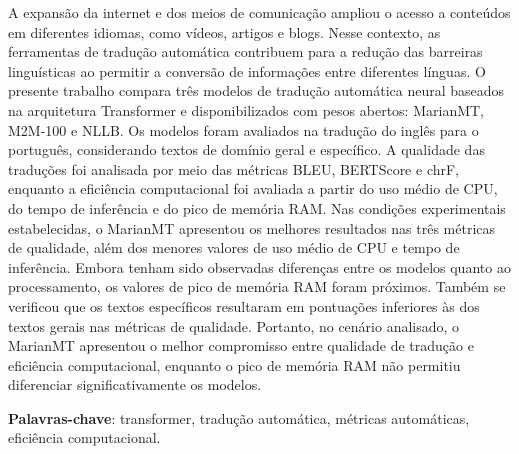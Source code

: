 \begin{resumo}

    \noindent
        A expansão da internet e dos meios de comunicação ampliou o acesso a conteúdos em diferentes idiomas, como vídeos, artigos e blogs. Nesse contexto, as ferramentas de tradução automática contribuem para a redução das barreiras linguísticas ao permitir a conversão de informações entre diferentes línguas. O presente trabalho compara três modelos de tradução automática neural baseados na arquitetura Transformer e disponibilizados com pesos abertos: MarianMT, M2M-100 e NLLB. Os modelos foram avaliados na tradução do inglês para o português, considerando textos de domínio geral e específico. A qualidade das traduções foi analisada por meio das métricas BLEU, BERTScore e chrF, enquanto a eficiência computacional foi avaliada a partir do uso médio de CPU, do tempo de inferência e do pico de memória RAM. Nas condições experimentais estabelecidas, o MarianMT apresentou os melhores resultados nas três métricas de qualidade, além dos menores valores de uso médio de CPU e tempo de inferência. Embora tenham sido observadas diferenças entre os modelos quanto ao processamento, os valores de pico de memória RAM foram próximos. Também se verificou que os textos específicos resultaram em pontuações inferiores às dos textos gerais nas métricas de qualidade. Portanto, no cenário analisado, o MarianMT apresentou o melhor compromisso entre qualidade de tradução e eficiência computacional, enquanto o pico de memória RAM não permitiu diferenciar significativamente os modelos.
    \noindent

    \textbf{Palavras-chave}: transformer, tradução automática, métricas automáticas, eficiência computacional.

\end{resumo}
